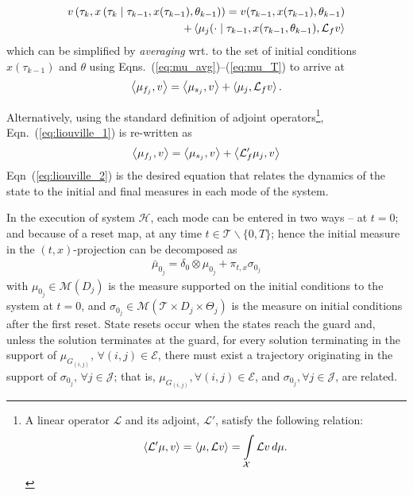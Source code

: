\small
\begin{align}
\begin{split}
    v\left(\tau_k,x\left(\tau_{k}\mid \tau_{k-1},x(\tau_{k-1}),\theta_{k-1}\right)\right)=v(\tau_{k-1},x(\tau_{k-1}),\theta_{k-1})\\
    +\left\langle \mu_j(\cdot\mid \tau_{k-1},x(\tau_{k-1},\theta_{k-1}),\mathcal L_{ f}v\right\rangle
\end{split}
\end{align}
\normalsize
which can be simplified by \emph{averaging} wrt. to the set of initial conditions $x(\tau_{k-1})$ and $\theta$ using Eqns.~(\ref{eq:mu_avg})--(\ref{eq:mu_T}) to arrive at
\begin{align}
  \left\langle \mu_{f_j},v\right\rangle=\left\langle \mu_{s_j},v\right\rangle+\left\langle \mu_{j},\mathcal L_{f}v\right\rangle.
  \label{eq:liouville_1}
\end{align}
\par
Alternatively, using the standard definition of adjoint operators\footnote{A linear operator $\mathcal L$ and its adjoint, $\mathcal L'$, satisfy the following relation:
\begin{align*}
    \left\langle \mathcal L'\mu,v\right\rangle=\left\langle \mu,\mathcal Lv\right\rangle=\int\limits_{\mathcal X}\mathcal Lv\,d\mu.
\end{align*}}, Eqn.~(\ref{eq:liouville_1}) is re-written as
\begin{align}
\left\langle \mu_{f_j},v\right\rangle=\left\langle \mu_{s_j},v\right\rangle+\left\langle \mathcal L'_{f}\mu_{j},v\right\rangle
  \label{eq:liouville_2}
\end{align}
Eqn~(\ref{eq:liouville_2}) is the desired equation that relates the dynamics of the state to the initial and final measures in each mode of the system.
\par
In the execution of system $\mathcal H$, each mode can be entered in two ways -- at $t=0$; and because of a reset map, at any time $t\in \mathcal T\backslash\{0,T\}$; hence the initial measure in the $(t,x)$-projection can be decomposed as
\begin{align}
  \bar\mu_{0_j}=\delta_0\otimes\mu_{0_j}+\pi_{t,x}\sigma_{0_j}
\end{align}
with $\mu_{0_j}\in \mathcal M(D_j)$ is the measure supported on the initial conditions to the system at $t=0$, and $\sigma_{0_j}\in \mathcal M(\mathcal T\times D_j\times \Theta_j)$ is the measure on initial conditions after the first reset. State resets occur when the states reach the guard and, unless the solution terminates at the guard, for every solution terminating in the support of $\mu_{ G_{(i,j)}},\,\forall (i,j)\in \mathcal E$, there must exist a trajectory originating in the support of $\sigma_{0_j},\,\forall j\in \mathcal J$; that is, $\mu_{ G_{(i,j)}},\forall (i,j)\in \mathcal E$, and $\sigma_{0_j},\forall j\in \mathcal J$, are related.
